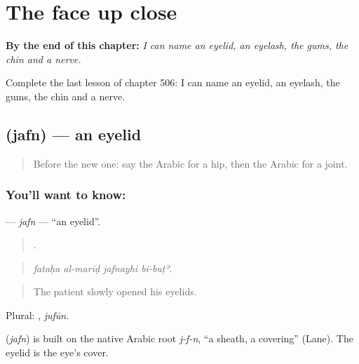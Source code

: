 
\chapter{The face up close}
\label{ch:ar-the-face-up-close}

\begin{chapteropening}
\textbf{By the end of this chapter:} \emph{I can name an eyelid, an eyelash, the gums, the chin and a nerve.}

Complete the last lesson of chapter 506: I can name an eyelid, an eyelash, the gums, the chin and a nerve.
\end{chapteropening}

\section[\texorpdfstring{\ar{جفن} (jafn)}{جفن (jafn)}]{ (jafn) — an eyelid}

\label{lesson:AR-C506-jafn}



\begin{quote}
Before the new one: say the Arabic for a hip, then the Arabic for a joint.
\end{quote}

\subsection*{You'll want to know: }
\textbf{} — \emph{jafn} — \textquotedblleft{}an eyelid\textquotedblright{}.

\begin{quote}
   .
\end{quote}

\begin{quote}
\emph{fataḥa al-marīḍ jafnayhi bi-buṭʾ.}
\end{quote}

\begin{quote}
The patient slowly opened his eyelids.
\end{quote}

Plural: , \emph{jufūn}.

\begin{cousinweb}
\textbf{} (\emph{jafn}) is built on the native Arabic root \emph{j-f-n}, \textquotedblleft{}a sheath, a covering\textquotedblright{} (Lane). The eyelid is the eye's cover.
\end{cousinweb}

